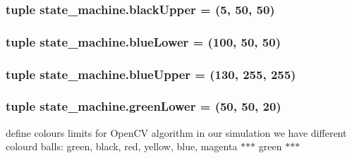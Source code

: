 \subsubsection[{\texorpdfstring{black\+Upper}{blackUpper}}]{\setlength{\rightskip}{0pt plus 5cm}tuple state\+\_\+machine.\+black\+Upper = (5, 50, 50)}\hypertarget{namespacestate__machine_a07afd0b9efebc18e612ffbf6f0d729ca}{}\label{namespacestate__machine_a07afd0b9efebc18e612ffbf6f0d729ca}
\subsubsection[{\texorpdfstring{blue\+Lower}{blueLower}}]{\setlength{\rightskip}{0pt plus 5cm}tuple state\+\_\+machine.\+blue\+Lower = (100, 50, 50)}\hypertarget{namespacestate__machine_a0410a5010d534f980f7b6690b58961da}{}\label{namespacestate__machine_a0410a5010d534f980f7b6690b58961da}
\subsubsection[{\texorpdfstring{blue\+Upper}{blueUpper}}]{\setlength{\rightskip}{0pt plus 5cm}tuple state\+\_\+machine.\+blue\+Upper = (130, 255, 255)}\hypertarget{namespacestate__machine_acaae31790ee8ca5aedbf802044e5c489}{}\label{namespacestate__machine_acaae31790ee8ca5aedbf802044e5c489}
\subsubsection[{\texorpdfstring{green\+Lower}{greenLower}}]{\setlength{\rightskip}{0pt plus 5cm}tuple state\+\_\+machine.\+green\+Lower = (50, 50, 20)}\hypertarget{namespacestate__machine_aa0d3e8fce4b6fe8788f035c40482a6c6}{}\label{namespacestate__machine_aa0d3e8fce4b6fe8788f035c40482a6c6}


define colours limits for Open\+CV algorithm in our simulation we have different colourd balls\+: green, black, red, yellow, blue, magenta $\ast$$\ast$$\ast$ green $\ast$$\ast$$\ast$ 

